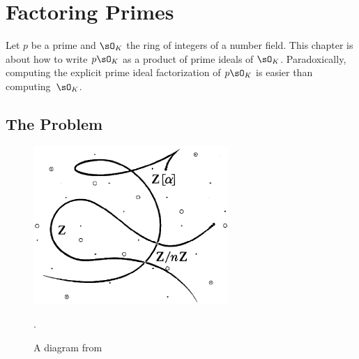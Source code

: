 
\chapter{Factoring Primes}\label{ch:factoring_primes}

Let $p$ be a prime and $\sO_K$ the ring of integers of a number field.
This chapter is about how to write $p\sO_K$ as a product of prime ideals
of $\sO_K$. Paradoxically, computing the explicit prime ideal factorization
of $p\sO_K$ is easier than computing~$\sO_K$.




\section{The Problem}

\begin{figure}
  \centering
  \includegraphics[width=20em]{img/spec}
  \caption{A diagram from \cite{lenstras:nfs}}.
\end{figure}

